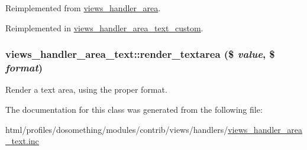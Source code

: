 Reimplemented from \hyperlink{classviews__handler__area_a9f3eb4b8ee98a0929946e8de7253d302}{views\_\-handler\_\-area}.

Reimplemented in \hyperlink{classviews__handler__area__text__custom_a04acaaef479eb115b7912b963967387c}{views\_\-handler\_\-area\_\-text\_\-custom}.\hypertarget{classviews__handler__area__text_a49adb1db6c56bf8f5ec74ed6015c739e}{
\subsubsection[{render\_\-textarea}]{\setlength{\rightskip}{0pt plus 5cm}views\_\-handler\_\-area\_\-text::render\_\-textarea (\$ {\em value}, \/  \$ {\em format})}}
\label{classviews__handler__area__text_a49adb1db6c56bf8f5ec74ed6015c739e}
Render a text area, using the proper format. 

The documentation for this class was generated from the following file:\begin{DoxyCompactItemize}
\item 
html/profiles/dosomething/modules/contrib/views/handlers/\hyperlink{views__handler__area__text_8inc}{views\_\-handler\_\-area\_\-text.inc}\end{DoxyCompactItemize}
